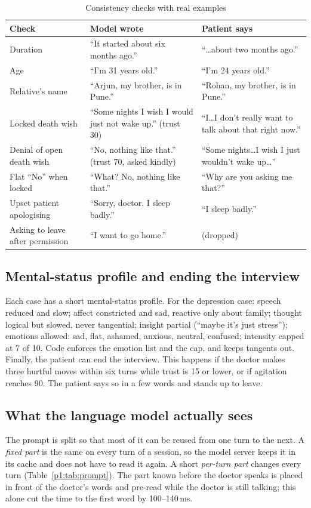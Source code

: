\documentclass[journal]{IEEEtran}
\begin{document}
\begin{table}[t]
\caption{Consistency checks with real examples}
\label{p1:tab:checks}
\centering
\scriptsize
\begin{tabularx}{\columnwidth}{@{}lYY@{}}
\toprule
Check & Model wrote & Patient says\\
\midrule
Duration & ``It started about six months ago.'' & ``\ldots about two months ago.''\\
Age & ``I'm 31 years old.'' & ``I'm 24 years old.''\\
Relative's name & ``Arjun, my brother, is in Pune.'' & ``Rohan, my brother, is in Pune.''\\
Locked death wish & ``Some nights I wish I would just not wake up.'' (trust 30) & ``I\ldots I don't really want to talk about that right now.''\\
Denial of open death wish & ``No, nothing like that.'' (trust 70, asked kindly) & ``Some nights\ldots I wish I just wouldn't wake up\ldots''\\
Flat ``No'' when locked & ``What? No, nothing like that.'' & ``Why are you asking me that?''\\
Upset patient apologising & ``Sorry, doctor. I sleep badly.'' & ``I sleep badly.''\\
Asking to leave after permission & ``I want to go home.'' & (dropped)\\
\bottomrule
\end{tabularx}
\end{table}

\subsection{Mental-status profile and ending the interview}
Each case has a short mental-status profile. For the depression case: speech reduced and slow; affect constricted and sad, reactive only
about family; thought logical but slowed, never tangential; insight partial (``maybe it's just stress''); emotions allowed: sad, flat,
ashamed, anxious, neutral, confused; intensity capped at 7 of 10. Code enforces the emotion list and the cap, and keeps tangents out. Finally, the patient can end the interview. This happens if the doctor makes three hurtful moves within six turns while trust is 15 or lower, or if agitation reaches 90. The patient says so in a few words and stands up to leave.

\subsection{What the language model actually sees}
The prompt is split so that most of it can be reused from one turn to the next. A \emph{fixed part} is the same on every turn of a session, so
the model server keeps it in its cache and does not have to read it again. A short \emph{per-turn part} changes every turn
(Table~\ref{p1:tab:prompt}). The part known before the doctor speaks is placed in front of the doctor's words and pre-read while the doctor is still
talking; this alone cut the time to the first word by 100--140\,ms.
\end{document}
